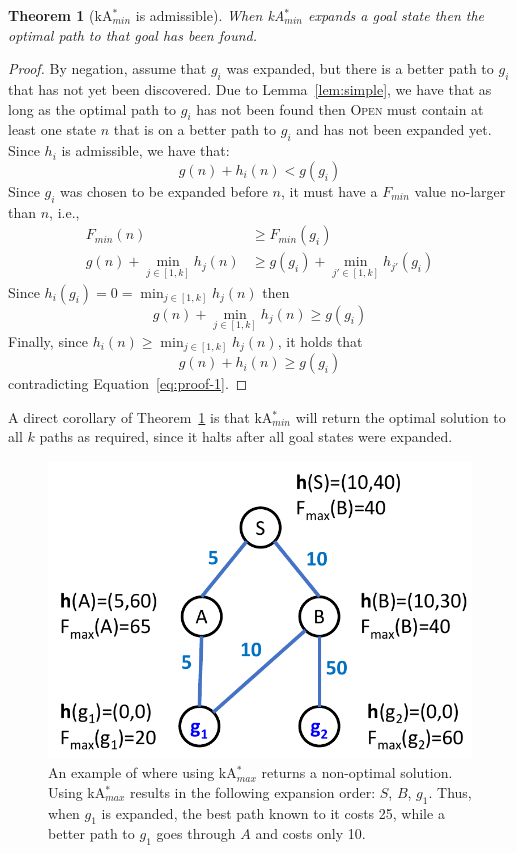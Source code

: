 \documentclass{aicom2e}
\newtheorem{theorem}{Theorem}
\newcommand{\kastarmin}{kA$^*_{min}$}
\newcommand{\kastarmax}{kA$^*_{max}$}
\newcommand{\open}{\textsc{Open}}
\begin{document}
\begin{theorem}[\kastarmin{} is admissible]
When \kastarmin{} expands a goal state then the optimal path to that goal has been found.
    \label{the:min-f}
\end{theorem}
 \begin{proof}
    By negation, assume that $g_i$ was expanded, but there is
    a better path to $g_i$ that has not yet been discovered. Due to Lemma~\ref{lem:simple}, we have that as long as the optimal path to $g_i$ has not been found then
    \open{} must contain at least one state $n$
    that is on a better path to $g_i$ and has not been expanded yet. Since $h_i$ is admissible, we have that:
    \begin{equation}
    g(n)+h_i(n)<g(g_i)
    \label{eq:proof-1}
    \end{equation}
    Since $g_i$ was chosen to be expanded before $n$, it must have a $F_{min}$ value no-larger than $n$, i.e.,
    \begin{align}
    F_{min}(n) &\geq  F_{min}(g_i) \\
    g(n)+\min_{j\in [1,k]}h_j(n)& \geq  g(g_i)+\min_{j'\in [1,k]}h_{j'}(g_i)
    \end{align}
    Since $h_i(g_i)=0=\min_{j\in [1,k]}h_j(n)$ then
    \[ g(n)+\min_{j\in [1,k]}h_j(n) \geq  g(g_i) \]
    Finally, since $h_i(n)\geq \min_{j\in [1,k]} h_j(n)$, it holds that
    \[ g(n)+h_i(n) \geq  g(g_i) \]
    contradicting Equation~\ref{eq:proof-1}.
\end{proof}

A direct corollary of Theorem~\ref{the:min-f} is that \kastarmin{} will return the optimal solution to all $k$ paths as required, since it halts after all goal states were expanded.




\begin{figure}
 \includegraphics[width=0.9\columnwidth]{max-bad_cropped.pdf}
 \caption{An example of where using \kastarmax{} returns a non-optimal solution. Using \kastarmax{} results in the following expansion order: $S$, $B$, $g_1$.
 Thus, when $g_1$ is expanded, the best path known to it costs 25, while a
 better path to $g_1$ goes through $A$ and costs only 10.}
 \label{fig:max-bad}
 \end{figure}
\end{document}
